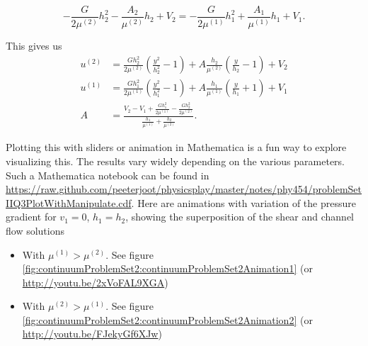 \begin{equation}\label{eqn:continuumProblemSet2:900}
-\frac{G}{2 \mu^{(2)}}h_2^2 - \frac{A_2}{\mu^{(2)}} h_2 + V_2 = -\frac{G}{2 \mu^{(1)}}h_1^2 + \frac{A_1}{\mu^{(1)}} h_1 + V_1.
\end{equation}

This gives us
\begin{align}\label{eqn:continuumProblemSet2:920}
u^{(2)} &= \frac{G h_2^2}{2 \mu^{(2)}}\left(\frac{y^2}{h_2^2} - 1 \right) + A \frac{ h_2}{\mu^{(2)}} \left( \frac{y}{h_2} - 1 \right) + V_2 \\
u^{(1)} &= \frac{G h_1^2}{2 \mu^{(1)}}\left(\frac{y^2}{h_1^2} - 1 \right) + A \frac{ h_1}{\mu^{(1)}} \left( \frac{y}{h_1} + 1 \right) + V_1 \\
A 
&=
\frac{
V_2 - V_1
+ 
\frac{G h_1^2}{2 \mu^{(1)}}
-\frac{G h_2^2}{2 \mu^{(2)}}
}{
\frac{h_1}{\mu^{(1)}}
+\frac{h_2}{\mu^{(2)}}
}.
\end{align}

Plotting this with sliders or animation in Mathematica is a fun way to explore visualizing this.  The results vary widely depending on the various parameters.  Such a Mathematica notebook can be found in \href{https://raw.github.com/peeterjoot/physicsplay/master/notes/phy454/problemSetIIQ3PlotWithManipulate.cdf}{https://raw.github.com/peeterjoot/physicsplay/master/notes/phy454/problemSetIIQ3PlotWithManipulate.cdf}.  Here are animations with variation of the pressure gradient for $v_1 = 0$, $h_1 = h_2$, showing the superposition of the shear and channel flow solutions

\begin{itemize}
\item With $\mu^{(1)} > \mu^{(2)}$.  See figure \ref{fig:continuumProblemSet2:continuumProblemSet2Animation1} (or \href{http://youtu.be/2xVoFAL9XGA}{http://youtu.be/2xVoFAL9XGA})

\item With $\mu^{(2)} > \mu^{(1)}$.  See figure \ref{fig:continuumProblemSet2:continuumProblemSet2Animation2} (or \href{http://youtu.be/FJekyGf6XJw}{http://youtu.be/FJekyGf6XJw})
\end{itemize}




